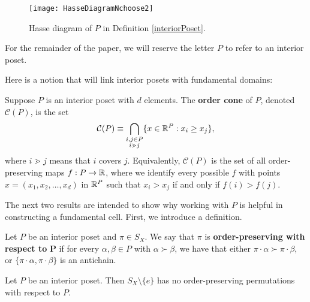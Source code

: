 \begin{figure}[h!]
\begin{center}
\texttt{[image: HasseDiagramNchoose2]}
\caption{Hasse diagram of $P$ in Definition \ref{interiorPoset}.}\label{Hasse2}
\end{center}
\end{figure}

For the remainder of the paper, we will reserve the letter $P$ to refer to an interior poset.

Here is a notion that will link interior posets with fundamental domains:
\begin{defn}
Suppose $P$ is an interior poset with $d$ elements. The \textbf{order cone} of $P$, denoted $\mathcal{C}(P)$, is the set \[\mathcal{C}(P) \equiv \bigcap_{\substack{i,j \in P  \\ i \gtrdot j}} \{ x\in\mathbb{R}^P : x_i \ge x_j \},\] where $i \gtrdot j$ means that $i$ covers $j$. Equivalently, $\mathcal{C}(P)$ is the set of all order-preserving maps $f : P \rightarrow \mathbb{R}$, where we identify every possible $f$ with points $x = (x_1, x_2, \dots , x_d)$ in $\mathbb{R}^P$ such that $x_i > x_j$ if and only if $f(i) > f(j)$.
\end{defn}

The next two results are intended to show why working with $P$ is helpful in constructing a fundamental cell. First, we introduce a definition.

\begin{defn}
Let $P$ be an interior poset and $\pi \in S_X$. We say that $\pi$ is \textbf{order-preserving with respect to} $\boldsymbol P$ if for every $\alpha, \beta \in P$ with $\alpha \succ \beta$, we have that either $\pi \cdot \alpha \succ \pi \cdot \beta$, or $\{\pi \cdot \alpha, \pi \cdot \beta\}$ is an antichain.
\end{defn}

\iffalse
\begin{defn}
Let $\pi \in S_X$ and $\langle \pi \rangle$ be the cyclic group generated by $\pi$. We say that $\pi$ is \textbf{free with respect to} $\boldsymbol P$ if for every $i \in P$, the orbit $\langle \pi \rangle_i$ is an antichain.
\end{defn}
\fi

\begin{prop}\label{noOrderPreservingPerms}
Let $P$ be an interior poset. Then $S_X\setminus\{e\}$ has no order-preserving permutations with respect to $P$.
\end{prop}

